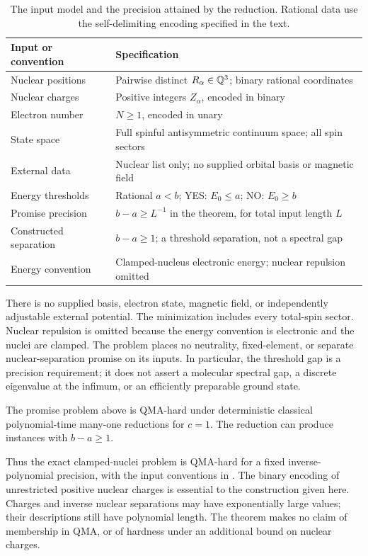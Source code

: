 \begin{table}[bp]
\centering
\begin{tabular}{@{}p{.25\linewidth}p{.68\linewidth}@{}}
\toprule
Input or convention & Specification\\
\midrule
Nuclear positions & Pairwise distinct $R_\alpha\in\mathbb Q^3$; binary rational coordinates\\
Nuclear charges & Positive integers $Z_\alpha$, encoded in binary\\
Electron number & $N\ge1$, encoded in unary\\
State space & Full spinful antisymmetric continuum space; all spin sectors\\
External data & Nuclear list only; no supplied orbital basis or magnetic field\\
Energy thresholds & Rational $a<b$; YES: $E_0\le a$; NO: $E_0\ge b$\\
Promise precision & $b-a\ge L^{-1}$ in the theorem, for total input length $L$\\
Constructed separation & $b-a\ge1$; a threshold separation, not a spectral gap\\
Energy convention & Clamped-nucleus electronic energy; nuclear repulsion omitted\\
\bottomrule
\end{tabular}
\caption{The input model and the precision attained by the reduction. Rational data use the self-delimiting encoding specified in the text.}
\label{tab:input-model}
\end{table}

There is no supplied basis, electron state, magnetic field, or independently adjustable external potential. The minimization includes every total-spin sector. Nuclear repulsion is omitted because the energy convention is electronic and the nuclei are clamped. The problem places no neutrality, fixed-element, or separate nuclear-separation promise on its inputs. In particular, the threshold gap is a precision requirement; it does not assert a molecular spectral gap, a discrete eigenvalue at the infimum, or an efficiently preparable ground state.

\begin{theorem}\label{thm:main}
The promise problem above is QMA-hard under deterministic classical polynomial-time many-one reductions for $c=1$. The reduction can produce instances with $b-a\ge1$.
\end{theorem}

Thus the exact clamped-nuclei problem is QMA-hard for a fixed inverse-polynomial precision, with the input conventions in . The binary encoding of unrestricted positive nuclear charges is essential to the construction given here. Charges and inverse nuclear separations may have exponentially large values; their descriptions still have polynomial length. The theorem makes no claim of membership in QMA, or of hardness under an additional bound on nuclear charges.

